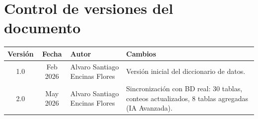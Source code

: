 \documentclass[11pt,a4paper]{article}
\begin{document}
\newpage
\section*{Control de versiones del documento}
\begin{table}[H]
\centering
\begin{tabularx}{\textwidth}{c c l X}
\toprule
\textbf{Versión} & \textbf{Fecha} & \textbf{Autor} & \textbf{Cambios} \\
\midrule
1.0 & Feb 2026 & Alvaro Santiago Encinas Flores & Versión inicial del diccionario de datos. \\
2.0 & May 2026 & Alvaro Santiago Encinas Flores & Sincronización con BD real: 30 tablas, conteos actualizados, 8 tablas agregadas (IA Avanzada). \\
\bottomrule
\end{tabularx}
\end{table}
\end{document}
